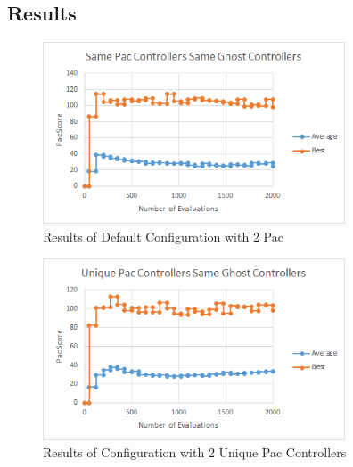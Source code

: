 \documentclass{article}
\begin{document}
\clearpage
\subsection{Results}
\begin{flushleft}
\begin{figure}[h]
	\centering
	\includegraphics[width=0.8\textwidth]{samePacSameGhost}
	\caption{Results of Default Configuration with 2 Pac}
\end{figure}

\begin{figure}[h]
	\centering
	\includegraphics[width=0.8\textwidth]{diffPacSameGhost}
	\caption{Results of Configuration with 2 Unique Pac Controllers}
\end{figure}
\end{flushleft}

\clearpage
\end{document}
